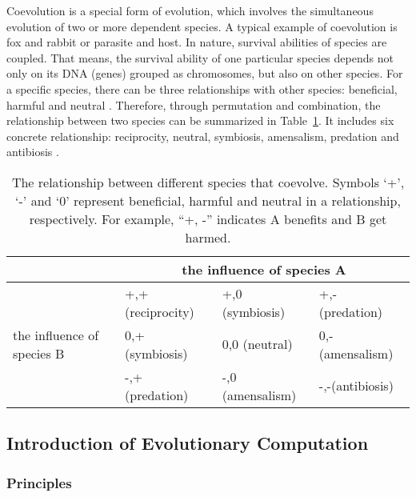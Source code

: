 Coevolution is a special form of evolution, which involves the simultaneous evolution of two or more dependent species. A typical example of coevolution is fox and rabbit or parasite and host. In nature, survival abilities of species are coupled. That means, the survival ability of one particular species depends not only on its DNA (genes) grouped as chromosomes, but also on other species. For a specific species, there can be three relationships with other species: beneficial, harmful and neutral \cite{BiLi2009}. Therefore, through permutation and combination, the relationship between two species can be summarized in Table~\ref{tab:relationship_species_coevolution}. It includes six concrete relationship: reciprocity, neutral, symbiosis, amensalism, predation and antibiosis \cite{BiLi2009}.

\begin{table}[!t]          
  \centering                     
  \caption{The relationship between different species that coevolve. Symbols `+', `-' and `0' represent beneficial, harmful and neutral in a relationship, respectively. For example, ``+, -'' indicates A benefits and B get harmed.}
  \label{tab:relationship_species_coevolution} 
  \renewcommand{\arraystretch}{1.7}
  \begin{tabularx}{430pt}{l|l|l|l}                                                    
    \hline                                                                %
     & \multicolumn{3}{c}{the influence of species A } \\                       %
    \hline
    & +,+ (reciprocity)  & +,0 (symbiosis)   & +,- (predation)   \\
    the influence of species B & 0,+ (symbiosis) & 0,0 (neutral) & 0,- (amensalism)  \\
    & -,+ (predation)    & -,0 (amensalism) & -,-(antibiosis) \\
    \hline
  \end{tabularx}
\end{table}

\subsection{Introduction of Evolutionary Computation}\label{sec:intro_evolutionary_computation}

\subsubsection{Principles}\label{sec:principles_evolutionary_computation}

